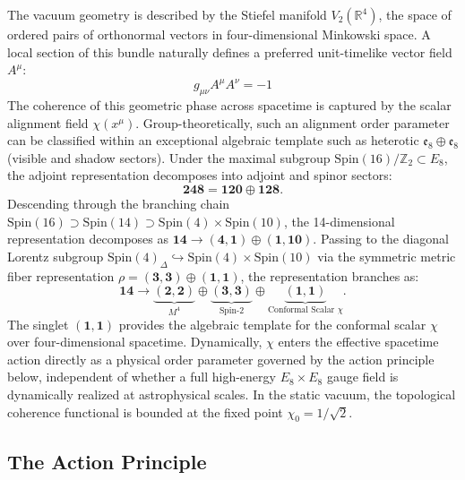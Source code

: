 \documentclass[twocolumn,amsmath,amssymb,floatfix]{article}
\begin{document}
The vacuum geometry is described by the Stiefel manifold $V_2(\mathbb{R}^4)$, the space of ordered pairs of orthonormal vectors in four-dimensional Minkowski space. A local section of this bundle naturally defines a preferred unit-timelike vector field $A^\mu$:
\begin{equation}
    g_{\mu\nu} A^\mu A^\nu = -1
\end{equation}
The coherence of this geometric phase across spacetime is captured by the scalar alignment field $\chi(x^\mu)$. Group-theoretically, such an alignment order parameter can be classified within an exceptional algebraic template such as heterotic $\mathfrak{e}_8 \oplus \mathfrak{e}_8$ (visible and shadow sectors). Under the maximal subgroup $\mathrm{Spin}(16)/\mathbb{Z}_2 \subset E_8$, the adjoint representation decomposes into adjoint and spinor sectors:
\begin{equation}
    \mathbf{248} = \mathbf{120} \oplus \mathbf{128}.
\end{equation}
Descending through the branching chain $\mathrm{Spin}(16) \supset \mathrm{Spin}(14) \supset \mathrm{Spin}(4) \times \mathrm{Spin}(10)$, the 14-dimensional representation decomposes as $\mathbf{14} \to (\mathbf{4},\mathbf{1}) \oplus (\mathbf{1},\mathbf{10})$. Passing to the diagonal Lorentz subgroup $\mathrm{Spin}(4)_\Delta \hookrightarrow \mathrm{Spin}(4) \times \mathrm{Spin}(10)$ via the symmetric metric fiber representation $\rho = (\mathbf{3},\mathbf{3}) \oplus (\mathbf{1},\mathbf{1})$, the representation branches as:
\begin{equation}
    \mathbf{14} \longrightarrow \underbrace{(\mathbf{2},\mathbf{2})}_{M^4} \oplus \underbrace{(\mathbf{3},\mathbf{3})}_{\text{Spin-2}} \oplus \underbrace{(\mathbf{1},\mathbf{1})}_{\text{Conformal Scalar } \chi}.
\end{equation}
The singlet $(\mathbf{1},\mathbf{1})$ provides the algebraic template for the conformal scalar $\chi$ over four-dimensional spacetime. Dynamically, $\chi$ enters the effective spacetime action directly as a physical order parameter governed by the action principle below, independent of whether a full high-energy $E_8 \times E_8$ gauge field is dynamically realized at astrophysical scales. In the static vacuum, the topological coherence functional is bounded at the fixed point $\chi_0 = 1/\sqrt{2}$.

\subsection{The Action Principle}
\end{document}
